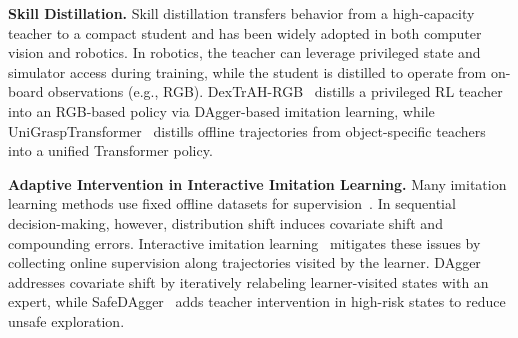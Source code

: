 


\textbf{Skill Distillation.} Skill distillation transfers behavior from a high-capacity teacher to a compact student and has been widely adopted
in both computer vision and robotics. In robotics, the teacher can leverage privileged state and simulator access during training,
while the student is distilled to operate from on-board observations (e.g., RGB). DexTrAH-RGB~\cite{singh2024dextrah} 
distills a privileged RL teacher into an RGB-based policy via DAgger-based imitation learning, while 
UniGraspTransformer~\cite{wang2025unigrasptransformer} distills offline trajectories from object-specific teachers 
into a unified Transformer policy.

\textbf{Adaptive Intervention in Interactive Imitation Learning.} Many imitation learning methods use fixed offline datasets for supervision~\cite{zhang2025contactdexnet,zhang2025omnidexvlg}. In sequential decision-making, however, distribution shift induces covariate shift and compounding errors. Interactive imitation learning~\cite{welte2025interactive} mitigates these issues by collecting online supervision along trajectories visited by the learner.
DAgger~\cite{ross2011reduction} addresses covariate shift by iteratively relabeling learner-visited states with an expert, while SafeDAgger~\cite{zhang2016query} adds teacher intervention in high-risk states to reduce unsafe exploration.

